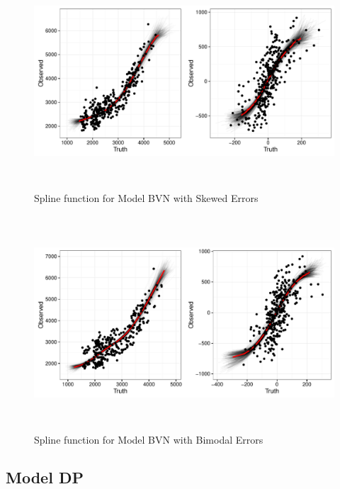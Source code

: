 \documentclass[11pt]{article}\usepackage[]{graphicx}\usepackage[]{color}
\begin{document}
  \begin{figure}
  \centering
  \includegraphics[width=17cm,height=8cm]{manual_figure/predbvnsx.pdf}
  \caption{Spline function for Model BVN with Skewed Errors}
  \label{predbvnsx}
  \end{figure}

  \begin{figure}
  \centering
  \includegraphics[width=17cm,height=8cm]{manual_figure/predbvnbx.pdf}
  \caption{Spline function for Model BVN with Bimodal Errors}
  \label{predbvnbx}
  \end{figure}

% 
% 
\subsection{Model DP}
\end{document}
